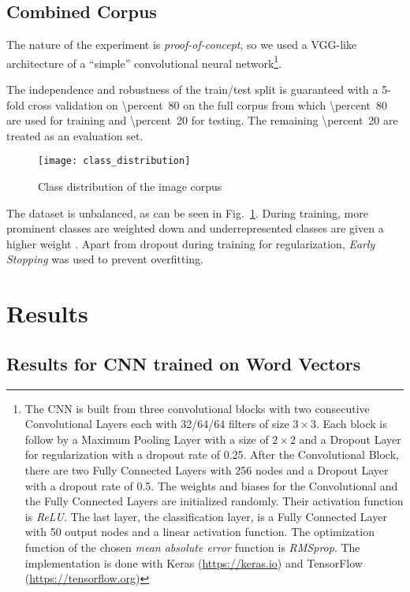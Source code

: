 \subsection{Combined Corpus}
The nature of the experiment is \emph{proof-of-concept}, so we used a VGG-like architecture of a \enquote{simple} convolutional neural network\footnote{The CNN is built from three convolutional blocks with two consecutive Convolutional Layers each with 32/64/64 filters of size $ 3 \times 3 $. Each block is follow by a Maximum Pooling Layer with a size of $ 2 \times 2 $ and a Dropout Layer for regularization with a dropout rate of \num{0.25}. After the Convolutional Block, there are two Fully Connected Layers with \num{256} nodes and a Dropout Layer with a dropout rate of \num{0.5}. The weights and biases for the Convolutional and the Fully Connected Layers are initialized randomly. Their activation function is \emph{ReLU}. The last layer, the classification layer, is a Fully Connected Layer with \num{50} output nodes and a linear activation function. The optimization function of the chosen \emph{mean absolute error} function is \emph{RMSprop}. The implementation is done with Keras (\url{https://keras.io}) and TensorFlow (\url{https://tensorflow.org})}.

The independence and robustness of the train/test split is guaranteed with a 5-fold cross validation on \SI{\percent}{80} on the full corpus from which \SI{\percent}{80} are used for training and \SI{\percent}{20} for testing. The remaining \SI{\percent}{20} are treated as an evaluation set.

\begin{figure}
	\centering
	\texttt{[image: class\_distribution]}
	\caption{Class distribution of the image corpus}
	\label{fig:class_distribution}
\end{figure}

The dataset is unbalanced, as can be seen in Fig.~\ref{fig:class_distribution}. During training, more prominent classes are weighted down and underrepresented classes are given a higher weight \parencite[p.~27]{johnson_SurveyDeepLearningClassImbalance_2019}. Apart from dropout during training for regularization, \emph{Early Stopping} was used to prevent overfitting.


\section{Results}

\subsection{Results for CNN trained on Word Vectors}

